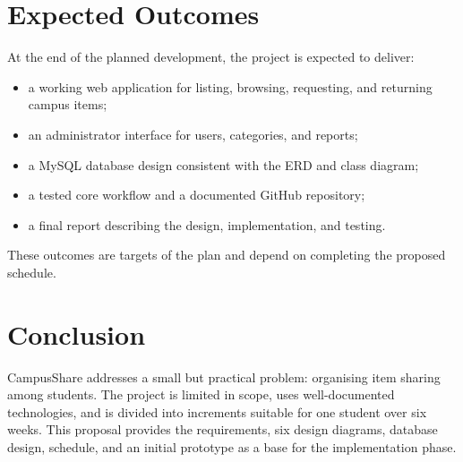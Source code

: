 \documentclass[11pt,a4paper]{article}
\begin{document}
\section{Expected Outcomes}
At the end of the planned development, the project is expected to deliver:
\begin{itemize}
  \item a working web application for listing, browsing, requesting, and returning campus items;
  \item an administrator interface for users, categories, and reports;
  \item a MySQL database design consistent with the ERD and class diagram;
  \item a tested core workflow and a documented GitHub repository;
  \item a final report describing the design, implementation, and testing.
\end{itemize}
These outcomes are targets of the plan and depend on completing the proposed schedule.

\section{Conclusion}
CampusShare addresses a small but practical problem: organising item sharing among students. The project is limited in scope, uses well-documented technologies, and is divided into increments suitable for one student over six weeks. This proposal provides the requirements, six design diagrams, database design, schedule, and an initial prototype as a base for the implementation phase.



\end{document}
